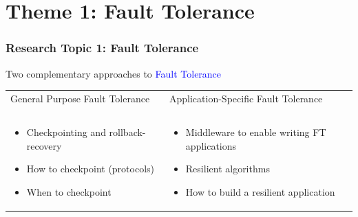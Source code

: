 \section[Fault Tolerance]{Theme 1: Fault Tolerance}

\begin{frame}
  \frametitle{Research Topic 1: Fault Tolerance}

  Two complementary approaches to \textcolor{blue}{Fault Tolerance}

  \bigskip

  \begin{tabular}{p{.45\linewidth}|p{.45\linewidth}}
    General Purpose Fault Tolerance     & Application-Specific Fault Tolerance \\
    &\\\hline
    &\\
    \begin{minipage}{\linewidth}
      \begin{itemize}
      \item Checkpointing and rollback-recovery
      \item How to checkpoint (protocols)
      \item When to checkpoint
      \end{itemize}
    \end{minipage} & \begin{minipage}{\linewidth}
      \begin{itemize}
      \item Middleware to enable writing FT applications
      \item Resilient algorithms
      \item How to build a resilient application
      \end{itemize}
    \end{minipage}
  \end{tabular}
\end{frame}


